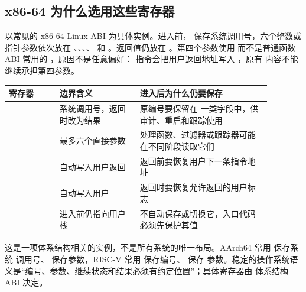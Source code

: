 \subsection{x86-64 为什么选用这些寄存器}

以常见的 x86-64 Linux ABI 为具体实例。进入前， 保存系统调用号，六个整数或
指针参数依次放在 、、、、 和
。返回值仍放在 。第四个参数使用  而不是普通函数 ABI
常用的 ，原因不是任意偏好： 指令会把用户返回地址写入
，原有  内容不能继续承担第四参数。

\begin{longtable}{|L{0.17\linewidth}|L{0.27\linewidth}|L{0.44\linewidth}|}
\hline
寄存器 & 边界含义 & 进入后为什么仍要保存 \\ \hline
{} & 系统调用号，返回时改为结果 & 原编号要保留在  一类字段中，供审计、重启和跟踪使用 \\ \hline
{} & 最多六个直接参数 & 处理函数、过滤器或跟踪器可能在不同阶段读取它们 \\ \hline
{} &  自动写入用户返回  & 返回前要恢复用户下一条指令地址 \\ \hline
{} &  自动写入用户  & 返回时要恢复允许返回的用户标志 \\ \hline
{} & 进入前仍指向用户栈 &  不自动保存或切换它，入口代码必须先保护其值 \\ \hline
\end{longtable}

这是一项体系结构相关的实例，不是所有系统的唯一布局。AArch64 常用  保存系统
调用号、 保存参数，RISC-V 常用  保存编号、 保存
参数。稳定的操作系统语义是“编号、参数、继续状态和结果必须有约定位置”；具体寄存器由
体系结构 ABI 决定。

